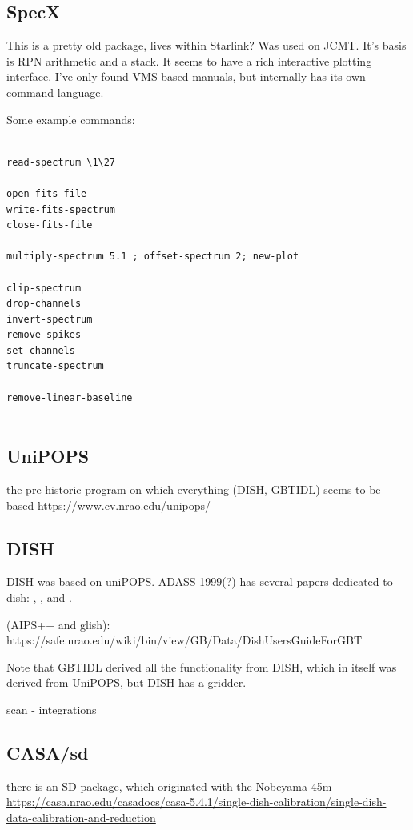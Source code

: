\documentclass[12pt,a4paper]{article}
\begin{document}
\subsection{SpecX}

This is a pretty old package, lives within Starlink? Was used on JCMT. It's
basis is  RPN arithmetic and a stack. It seems to have a rich interactive
plotting interface. I've only found VMS based manuals,
but internally has its own command language.

Some example commands:
\footnotesize\begin{verbatim}

read-spectrum \1\27

open-fits-file
write-fits-spectrum
close-fits-file

multiply-spectrum 5.1 ; offset-spectrum 2; new-plot

clip-spectrum
drop-channels
invert-spectrum
remove-spikes
set-channels
truncate-spectrum

remove-linear-baseline


\end{verbatim}
\normalsize

\subsection{UniPOPS}
the pre-historic program on which everything (DISH, GBTIDL) seems to be based
\url{https://www.cv.nrao.edu/unipops/}


\subsection{DISH}
DISH was based on uniPOPS. ADASS 1999(?) has several papers dedicated to dish:
\cite{2000ASPC..216..498G},
\cite{2000ASPC..216..494G}, and 
\cite{2000ASPC..216..243G}.

(AIPS++ and glish):  https://safe.nrao.edu/wiki/bin/view/GB/Data/DishUsersGuideForGBT

Note that GBTIDL derived all the functionality from DISH, which in itself was derived from UniPOPS,
but DISH has a gridder.

       scan  - integrations 

\subsection{CASA/sd}
  there is an SD package, which originated with the Nobeyama 45m\newline
  \url{https://casa.nrao.edu/casadocs/casa-5.4.1/single-dish-calibration/single-dish-data-calibration-and-reduction}
\end{document}
